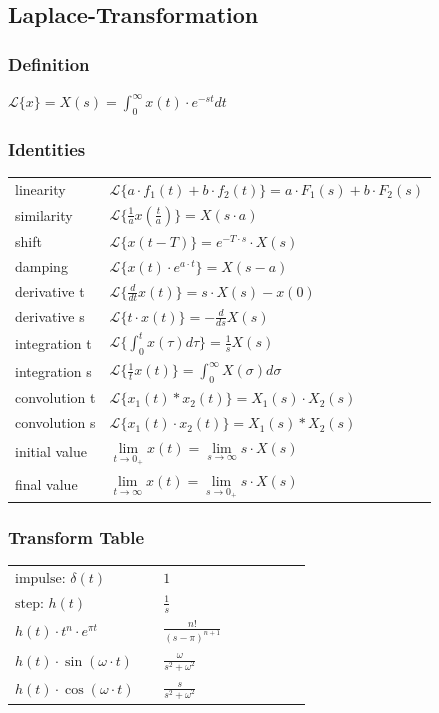 \documentclass[10pt,a4paper]{scrartcl}
\begin{document}
\begin{multicols*}{3}
	
	
	\subsection{Laplace-Transformation}
	
	\subsubsection{Definition}
	
	$\mathcal{L} \{x\}=X(s)=\int_0^\infty{x(t)\cdot e^{-st}dt}$
	
	\subsubsection{Identities}
	\small
	\begin{tabulary}{\linewidth}{L@{  :  }l}
	linearity&$\mathcal{L}\{a\cdot f_1(t)+b\cdot f_2(t)\}=a\cdot F_1(s)+b\cdot F_2(s)$\\
	similarity&$\mathcal{L}\{\frac{1}{a}x(\frac{t}{a})\}=X(s\cdot a)$\\
	shift&$\mathcal{L}\{x(t-T)\}=e^{-T\cdot s}\cdot X(s)$\\
	damping&$\mathcal{L}\{x(t)\cdot e^{a\cdot t}\}=X(s-a)$\\
	derivative t&$\mathcal{L}\{\frac{d}{dt}x(t)\}=s\cdot X(s)-x(0)$\\
	derivative s&$\mathcal{L}\{t\cdot x(t)\}=-\frac{d}{ds}X(s)$\\
	integration t&$\mathcal{L}\{\int_0^t{x(\tau)d\tau}\}=\frac{1}{s}X(s)$\\
	integration s&$\mathcal{L}\{\frac{1}{t}x(t)\}=\int_0^\infty{X(\sigma)d\sigma}$\\
	convolution t&$\mathcal{L}\{x_1(t)*x_2(t)\}=X_1(s)\cdot X_2(s)$\\
	convolution s&$\mathcal{L}\{x_1(t)\cdot x_2(t)\}=X_1(s)*X_2(s)$\\
	initial value&$\lim\limits_{t\rightarrow 0_+}{x(t)}=\lim\limits_{s\rightarrow\infty}{s\cdot X(s)}$\\
	final value&$\lim\limits_{t\rightarrow\infty}{x(t)}=\lim\limits_{s\rightarrow 0_+}{s\cdot X(s)}$
	\end{tabulary}
	\normalsize
	
	\subsubsection{Transform Table}
	
	\begin{tabular}{p{0.45\linewidth}|p{0.45\linewidth}}
	\hline
	$\text{impulse: }\delta(t)$&$1$\\
	$\text{step: }h(t)$&$\frac{1}{s}$\\
	$h(t)\cdot t^n\cdot e^{\pi t}$&$\frac{n!}{(s-\pi)^{n+1}}$\\
	$h(t)\cdot\sin(\omega\cdot t)$&$\frac{\omega}{s^2+\omega^2}$\\
	$h(t)\cdot\cos(\omega\cdot t)$&$\frac{s}{s^2+\omega^2}$\\
	\hline
	\end{tabular}
	

\end{multicols*}
\end{document}
